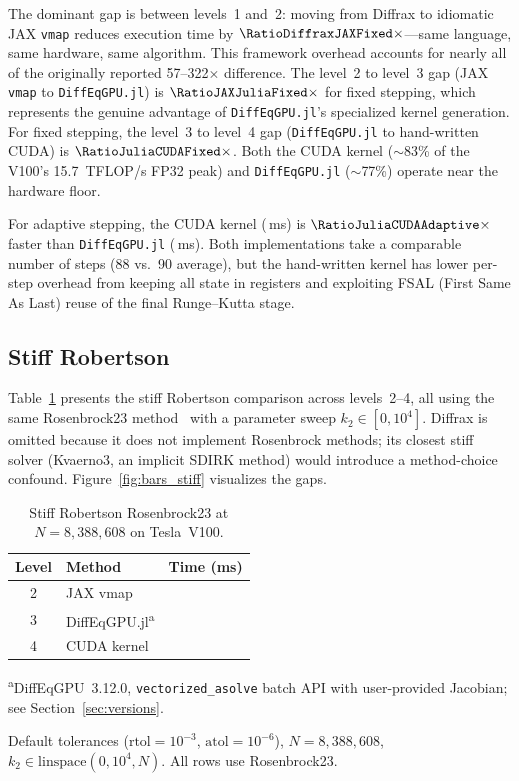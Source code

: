 \documentclass[11pt]{article}
\begin{document}
The dominant gap is between levels~1 and~2: moving from Diffrax
to idiomatic JAX \texttt{vmap} reduces execution time by
$\RatioDiffraxJAXFixed\times$---same language, same hardware, same algorithm.
This framework overhead accounts for nearly all of the originally
reported 57--322$\times$ difference.
The level~2 to level~3 gap (JAX \texttt{vmap} to
\texttt{DiffEqGPU.jl}) is $\RatioJAXJuliaFixed\times$ for fixed stepping, which
represents the genuine advantage of \texttt{DiffEqGPU.jl}'s
specialized kernel generation.
For fixed stepping, the level~3 to level~4 gap
(\texttt{DiffEqGPU.jl} to hand-written CUDA) is $\RatioJuliaCUDAFixed\times$.
Both the CUDA kernel (${\sim}$83\% of the V100's 15.7~TFLOP/s
FP32 peak) and \texttt{DiffEqGPU.jl} (${\sim}$77\%) operate near
the hardware floor.

For adaptive stepping, the CUDA kernel (\CUDALorenzAdaptive\,ms) is $\RatioJuliaCUDAAdaptive\times$
faster than \texttt{DiffEqGPU.jl} (\JuliaLorenzAdaptive\,ms).
Both implementations take a comparable number of steps (88 vs.\
90 average), but the hand-written kernel has lower per-step
overhead from keeping all state in registers and exploiting
FSAL (First Same As Last) reuse of the final Runge--Kutta stage.

\subsection{Stiff Robertson}

Table~\ref{tab:robertson} presents the stiff Robertson comparison
across levels~2--4, all using the same Rosenbrock23
method~\cite{hairer_wanner} with a parameter sweep
$k_2 \in [0, 10^4]$.
Diffrax is omitted because it does not implement Rosenbrock
methods; its closest stiff solver (Kvaerno3, an implicit SDIRK
method) would introduce a method-choice confound.
Figure~\ref{fig:bars_stiff} visualizes the gaps.

\begin{table}[t]
\centering
\begin{tabular}{@{}clr@{}}
\toprule
Level & Method & Time (ms) \\
\midrule
2 & JAX vmap          & \JAXRobertson \\
3 & DiffEqGPU.jl\textsuperscript{a}      & \JuliaRobertson \\
4 & CUDA kernel       & \CUDARobertson \\
\bottomrule
\end{tabular}

\smallskip
{\footnotesize
\textsuperscript{a}DiffEqGPU~3.12.0, \texttt{vectorized\_asolve}
batch API with user-provided Jacobian;
see Section~\ref{sec:versions}.

Default tolerances ($\mathrm{rtol}=10^{-3}$,
$\mathrm{atol}=10^{-6}$), $N = 8{,}388{,}608$,
$k_2 \in \mathrm{linspace}(0, 10^4, N)$.
All rows use Rosenbrock23.}
\caption{Stiff Robertson Rosenbrock23 at $N = 8{,}388{,}608$ on
Tesla~V100.}
\label{tab:robertson}
\end{table}
\end{document}
